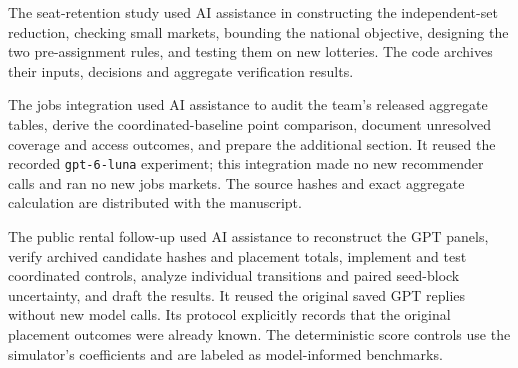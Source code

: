The seat-retention study used AI assistance in constructing the independent-set reduction, checking small markets, bounding the national objective, designing the two pre-assignment rules, and testing them on new lotteries. The code archives their inputs, decisions and aggregate verification results.

The jobs integration used AI assistance to audit the team's released aggregate
tables, derive the coordinated-baseline point comparison, document unresolved
coverage and access outcomes, and prepare the additional section. It reused
the recorded \texttt{gpt-6-luna} experiment; this integration made no new
recommender calls and ran no new jobs markets. The source hashes and exact
aggregate calculation are distributed with the manuscript.

The public rental follow-up used AI assistance to reconstruct the GPT panels,
verify archived candidate hashes and placement totals, implement and test
coordinated controls, analyze individual transitions and paired seed-block
uncertainty, and draft the results. It reused the original saved GPT replies
without new model calls. Its protocol explicitly records that the original
placement outcomes were already known. The deterministic score controls use
the simulator's coefficients and are labeled as model-informed benchmarks.
